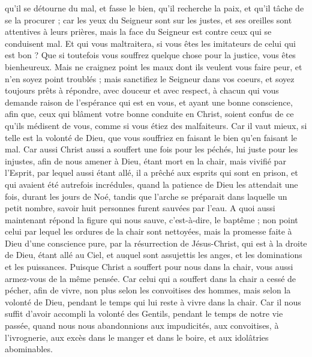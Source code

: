 \begin{multicols}{2}
qu'il se détourne du mal, et fasse le bien, qu'il recherche la paix, et qu'il tâche de se la procurer ;
car les yeux du Seigneur sont sur les justes, et ses oreilles sont attentives à leurs prières, mais la face du Seigneur est contre ceux qui se conduisent mal.
Et qui vous maltraitera, si vous êtes les imitateurs de celui qui est bon ?
Que si toutefois vous souffrez quelque chose pour la justice, vous êtes bienheureux. Mais ne craignez point les maux dont ils veulent vous faire peur, et n'en soyez point troublés ;
mais sanctifiez le Seigneur dans vos coeurs, et soyez toujours prêts à répondre, avec douceur et avec respect, à chacun qui vous demande raison de l'espérance qui est en vous, 
et ayant une bonne conscience, afin que, ceux qui blâment votre bonne conduite en Christ, soient confus de ce qu'ils médisent de vous, comme si vous étiez des malfaiteurs.
Car il vaut mieux, si telle est la volonté de Dieu, que vous souffriez en faisant le bien qu’en faisant le mal.
Car aussi Christ aussi a souffert une fois pour les péchés, lui juste pour les injustes, afin de nous amener à Dieu, étant mort en la chair, mais vivifié par l'Esprit,
par lequel aussi étant allé, il a  prêché aux esprits qui sont en prison,
et qui avaient été autrefois incrédules, quand la patience de Dieu les attendait une fois, durant les jours de Noé, tandis que l'arche se préparait dans laquelle un petit nombre, savoir huit personnes furent sauvées par l'eau.
A quoi aussi maintenant répond la figure qui nous sauve, c'est-à-dire, le baptême ; non point celui par lequel les ordures de la chair sont nettoyées, mais la promesse faite à Dieu d'une conscience pure, par la résurrection de Jésus-Christ,
qui est à la droite de Dieu, étant allé au Ciel, et auquel sont assujettis les anges, et les dominations et les puissances.
\VerseOne{}Puisque Christ a souffert pour nous dans la chair, vous aussi armez-vous de la même pensée. Car celui qui a souffert dans la chair a cessé de pécher,
afin de vivre, non plus selon les convoitises des hommes, mais selon la volonté de Dieu, pendant le temps qui lui reste à vivre dans la chair.
Car il nous suffit d'avoir accompli la volonté des Gentils, pendant le temps de notre vie passée, quand nous nous abandonnions aux impudicités, aux convoitises, à l'ivrognerie, aux excès dans le manger et dans le boire, et aux idolâtries abominables.

\end{multicols}
